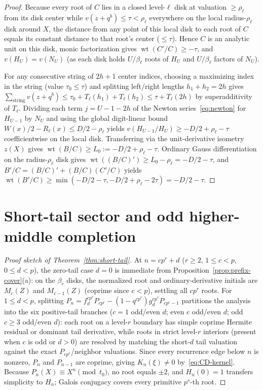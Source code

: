 \documentclass[11pt,reqno]{amsart}
\numberwithin{equation}{section}
\theoremstyle{definition}
\theoremstyle{remark}
\newcommand{\wt}{\operatorname{wt}}
\begin{document}
\begin{proof}
Because every root of $C$ lies in a closed level-$\ell$ disk at valuation $\ge \rho_\ell$ from its disk center while $v(z+q^b)\le\tau<\rho_\ell$ everywhere on the local radius-$\rho_\ell$ disk around $X$, the distance from any point of this local disk to each root of $C$ equals its constant distance to that root's center ($\le\tau$). Hence $C$ is an analytic unit on this disk, monic factorization gives $\wt(C'/C)\ge -\tau$, and $v(H_U) = v(N_U)$ (as each disk holds $U/\beta_\ell$ roots of $H_U$ and $U/\beta_\ell$ factors of $N_U$).

For any consecutive string of $2h+1$ center indices, choosing a maximizing index in the string (value $\tau_0\le\tau$) and splitting left/right lengths $h_1+h_2=2h$ gives $\sum_{\text{string}} v(z+q^b) \le \tau_0 + T_\ell(h_1)+T_\ell(h_2) \le \tau + T_\ell(2h)$ by superadditivity of $T_\ell$. Dividing each term $j=U-1-2h$ of the Newton series~\eqref{eq:newton} for $H_{U-1}$ by $N_U$ and using the global digit-linear bound $W(x)/2 - R_\ell(x) \le D/2 - \rho_\ell$ yields $v(H_{U-1}/H_U) \ge -D/2 + \rho_\ell - \tau$ coefficientwise on the local disk. Transferring via the unit-derivative isometry $z(X)$ gives $\wt(B/C) \ge L_0 := -D/2 + \rho_\ell - \tau$. Ordinary Gauss differentiation on the radius-$\rho_\ell$ disk gives $\wt((B/C)') \ge L_0 - \rho_\ell = -D/2 - \tau$, and $B'/C = (B/C)' + (B/C)(C'/C)$ yields $\wt(B'/C) \ge \min(-D/2-\tau, -D/2+\rho_\ell-2\tau) = -D/2-\tau$.
\end{proof}

\section{Short-tail sector and odd higher-middle completion}
\label{sec:short-odd}

\begin{proof}[Proof sketch of Theorem~\ref{thm:short-tail}]
At $n=cp^r+d$ ($r\ge 2$, $1\le c<p$, $0\le d<p$), the zero-tail case $d=0$ is immediate from Proposition~\ref{prop:prefix-cover}(a): on the $\beta_r$ disks, the normalized root and ordinary-derivative initials are $M_c(Z)$ and $M_{c-1}(Z)$ (coprime since $c<p$), settling all $cp^r$ roots. For $1\le d<p$, splitting $P_n = f_d^{cp^r}P_{cp^r} - (1-q^{cp^r})g_d^{cp^r}P_{cp^r-1}$ partitions the analysis into the six positive-tail branches ($c=1$ odd/even $d$; even $c$ odd/even $d$; odd $c\ge 3$ odd/even $d$): each root on a level-$r$ boundary has simple coprime Hermite residual or dominant tail derivative, while roots in strict level-$r$ interiors (present when $c$ is odd or $d>0$) are resolved by matching the short-$d$ tail valuation against the exact $P_{cp^r}$/neighbor valuations. Since every recurrence edge below $n$ is nonzero, $P_n$ and $P_{n-1}$ are coprime, giving $K_n(\xi)\ne 0$ by~\eqref{eq:CD-kernel}. Because $P_n(X)\equiv X^n\pmod{t_0}$, no root equals $\pm 2$, and $H_n(0)=1$ transfers simplicity to $H_n$; Galois conjugacy covers every primitive $p^s$-th root.
\end{proof}
\end{document}
